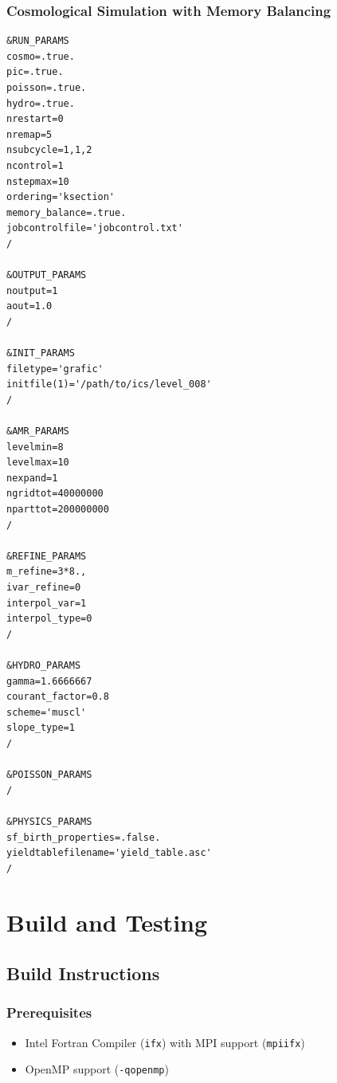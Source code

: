 \documentclass[11pt,fleqn]{book}
\begin{document}
\section{Cosmological Simulation with Memory Balancing}

\begin{codebox}
\begin{lstlisting}[style=fortran,numbers=none]
&RUN_PARAMS
cosmo=.true.
pic=.true.
poisson=.true.
hydro=.true.
nrestart=0
nremap=5
nsubcycle=1,1,2
ncontrol=1
nstepmax=10
ordering='ksection'
memory_balance=.true.
jobcontrolfile='jobcontrol.txt'
/

&OUTPUT_PARAMS
noutput=1
aout=1.0
/

&INIT_PARAMS
filetype='grafic'
initfile(1)='/path/to/ics/level_008'
/

&AMR_PARAMS
levelmin=8
levelmax=10
nexpand=1
ngridtot=40000000
nparttot=200000000
/

&REFINE_PARAMS
m_refine=3*8.,
ivar_refine=0
interpol_var=1
interpol_type=0
/

&HYDRO_PARAMS
gamma=1.6666667
courant_factor=0.8
scheme='muscl'
slope_type=1
/

&POISSON_PARAMS
/

&PHYSICS_PARAMS
sf_birth_properties=.false.
yieldtablefilename='yield_table.asc'
/
\end{lstlisting}
\end{codebox}


\part{Build and Testing}

\chapter{Build Instructions}
\label{ch:build}

\section{Prerequisites}

\begin{itemize}[leftmargin=2em]
  \item Intel Fortran Compiler (\texttt{ifx}) with MPI support (\texttt{mpiifx})
  \item OpenMP support (\texttt{-qopenmp})
\end{itemize}
\end{document}
